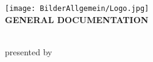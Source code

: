 \begin{titlepage}

\hspace{7cm}

\begin{center}
	\texttt{[image: BilderAllgemein/Logo.jpg]}\medskip \\
	\vspace{1cm}
	{\Large\uppercase\expandafter{\bf General Documentation}}\\[0.5ex]
	\vspace{1cm}
	\Large{\bf\large \Title}\\
	\vspace{1.5cm}
	\normalsize 
\end{center}

\vspace{10cm}

\begin{center}
	\normalsize presented by
	\\
	{
		\Large{\bf\large \Author}\\
	}
\end{center}


\vfill	

\begin{center}
\VenueMonthYear\\
\end{center}
\end{titlepage}